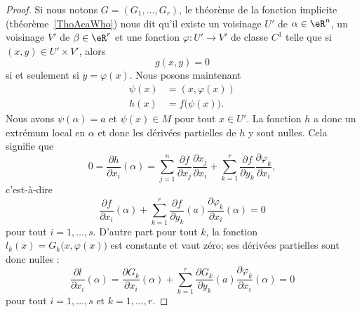 \begin{proof}
	Si nous notons \( G=(G_1,\ldots, G_r)\), le théorème de la fonction implicite (théorème~\ref{ThoAcaWho})  nous dit qu'il existe un voisinage \( U'\) de \( \alpha\in \eR^n\), un voisinage \( V'\) de \( \beta\in \eR^r\) et une fonction \( \varphi\colon U'\to V'\) de classe \( C^1\) telle que si \( (x,y)\in U'\times V'\), alors
	\begin{equation}
		g(x,y)=0
	\end{equation}
	si et seulement si \( y=\varphi(x)\). Nous posons maintenant
	\begin{subequations}
		\begin{align}
			\psi(x) & =(x,\varphi(x))        \\
			h(x)    & =f\big( \psi(x) \big).
		\end{align}
	\end{subequations}
	Nous avons \( \psi(\alpha)=a\) et \( \psi(x)\in M\) pour tout \( x\in U'\). La fonction \( h\) a donc un extrémum local en \( \alpha\) et donc les dérivées partielles de \( h\) y sont nulles. Cela signifie que
	\begin{equation}
		0=\frac{ \partial h }{ \partial x_i }(\alpha)=\sum_{j=1}^n\frac{ \partial f }{ \partial x_j }\frac{ \partial x_j }{ \partial x_i }+\sum_{k=1}^r\frac{ \partial f }{ \partial y_k }\frac{ \partial \varphi_k }{ \partial x_i },
	\end{equation}
	c'est-à-dire
	\begin{equation}
		\frac{ \partial f }{ \partial x_i }(\alpha)+\sum_{k=1}^r\frac{ \partial f }{ \partial y_k }(a)\frac{ \partial \varphi_k }{ \partial x_i }(\alpha)=0
	\end{equation}
	pour tout \( i=1,\ldots, s\). D'autre part pour tout \( k\), la fonction \( l_k(x)=G_k\big( x,\varphi(x) \big)\) est constante et vaut zéro; ses dérivées partielles sont donc nulles :
	\begin{equation}
		\frac{ \partial l }{ \partial x_i }(\alpha)=\frac{ \partial G_k }{ \partial x_i }(\alpha)+\sum_{k=1}^r\frac{ \partial G_k }{ \partial y_k }(a)\frac{ \partial \varphi_k }{ \partial x_i }(\alpha)=0
	\end{equation}
	pour tout \( i=1,\ldots, s\) et \( k=1,\ldots, r\).


\end{proof}
